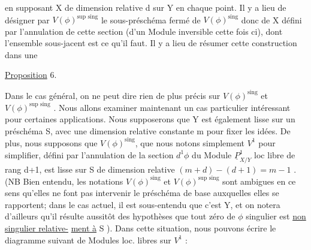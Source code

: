 
en supposant X de dimension relative d sur Y en chaque point.  Il y a
lieu de  désigner par  $V(\phi)^{\text{sup sing}}$ le sous-préschéma fermé de
 $V(\phi)^{\text{sing}}$ donc de X défini par l'annulation de cette section (d'un Module
inversible cette fois ci),  dont l'ensemble  sous-jacent est ce qu'il
faut. Il y a lieu de résumer cette construction dans une

\uline{Proposition} 6.

Dans le cas général, on ne peut  dire rien de plus précis sur
$V(\phi)^{\text{sing}}$ et $V(\phi)^{\text{sup sing}}$ .  Nous allons  examiner maintenant un cas
particulier\hand{,} intéressant pour certaines applications. Nous supposerons
que Y est également lisse sur un préschéma S, avec une dimension relative
constante m pour fixer les idées.  De plus, nous supposons que $V(\phi)^{\text{sing}}$,
que nous notons simplement $V^1$ pour simplifier, défini  par l'annulation
de la section $d^1\phi$  du Module $\underline{P}^1_{X/Y}$  loc libre de  rang d+1,
est  lisse sur S de dimension relative  $(m+d) - (d+1) = m-1$ . (NB  Bien
entendu, les notations $V(\phi)^{\text{sing}}$ et $V(\phi)^{\text{sup sing}}$ sont ambigues en ce sens
qu'elles ne font pas intervenir le préschéma de base  auxquelles elles
se rapportent; dans le cas actuel,  il est sous-entendu que c'est Y,
et on notera d'ailleurs qu'il résulte aussitôt des hypothèses que tout zéro de $\phi$ singulier est \uline{non singulier relative-}%
\uline{ment à} S ).  Dans cette situation, nous pouvons écrire  le diagramme
suivant de Modules loc. libres sur $V^1$ :


